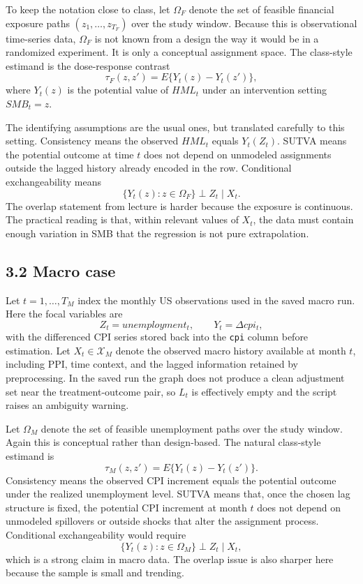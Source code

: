\documentclass[12pt]{article}
\begin{document}
To keep the notation close to class, let \(\Omega_F\) denote the set of feasible financial exposure
paths \((z_1,\dots,z_{T_F})\) over the study window. Because this is observational time-series
data, \(\Omega_F\) is not known from a design the way it would be in a randomized experiment. It is
only a conceptual assignment space. The class-style estimand is the dose-response contrast
\[
\tau_F(z,z') = E\{Y_t(z) - Y_t(z')\},
\]
where \(Y_t(z)\) is the potential value of \(HML_t\) under an intervention setting \(SMB_t=z\).

The identifying assumptions are the usual ones, but translated carefully to this setting.
Consistency means the observed \(HML_t\) equals \(Y_t(Z_t)\). SUTVA means the potential outcome at
time \(t\) does not depend on unmodeled assignments outside the lagged history already encoded in
the row. Conditional exchangeability means
\[
\{Y_t(z): z \in \Omega_F\} \perp Z_t \mid X_t.
\]
The overlap statement from lecture is harder because the exposure is continuous. The practical
reading is that, within relevant values of \(X_t\), the data must contain enough variation in SMB
that the regression is not pure extrapolation.

\subsection*{3.2 Macro case}

Let \(t=1,\dots,T_M\) index the monthly US observations used in the saved macro run. Here the focal
variables are
\[
Z_t = unemployment_t, \qquad Y_t = \Delta cpi_t,
\]
with the differenced CPI series stored back into the \texttt{cpi} column before estimation. Let
\(X_t \in \mathcal{X}_M\) denote the observed macro history available at month \(t\), including PPI,
time context, and the lagged information retained by preprocessing. In the saved run the graph does
not produce a clean adjustment set near the treatment-outcome pair, so \(L_t\) is effectively empty
and the script raises an ambiguity warning.

Let \(\Omega_M\) denote the set of feasible unemployment paths over the study window. Again this is
conceptual rather than design-based. The natural class-style estimand is
\[
\tau_M(z,z') = E\{Y_t(z) - Y_t(z')\}.
\]
Consistency means the observed CPI increment equals the potential outcome under the realized
unemployment level. SUTVA means that, once the chosen lag structure is fixed, the potential CPI
increment at month \(t\) does not depend on unmodeled spillovers or outside shocks that alter the
assignment process. Conditional exchangeability would require
\[
\{Y_t(z): z \in \Omega_M\} \perp Z_t \mid X_t,
\]
which is a strong claim in macro data. The overlap issue is also sharper here because the sample is
small and trending.
\end{document}
